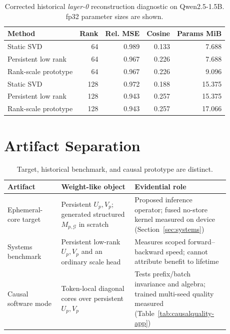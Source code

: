 \begin{table}[h]
\centering
\caption{Corrected historical \emph{layer-0} reconstruction diagnostic on
Qwen2.5-1.5B.  fp32 parameter sizes are shown.}
\label{tab:quality}
\begin{tabular}{lrrrr}
\toprule
Method & Rank & Rel. MSE & Cosine & Params MiB \\
\midrule
Static SVD & 64 & 0.989 & 0.133 & 7.688 \\
Persistent low rank & 64 & 0.967 & 0.226 & 7.688 \\
Rank-scale prototype & 64 & 0.967 & 0.226 & 9.096 \\
Static SVD & 128 & 0.972 & 0.188 & 15.375 \\
Persistent low rank & 128 & 0.943 & 0.257 & 15.375 \\
Rank-scale prototype & 128 & 0.943 & 0.257 & 17.066 \\
\bottomrule
\end{tabular}
\end{table}

\section{Artifact Separation}
\label{app:artifacts}

\begin{table}[h]
\centering
\caption{Target, historical benchmark, and causal prototype are distinct.}
\label{tab:artifact-separation}
\begin{tabular}{>{\raggedright\arraybackslash}p{0.22\linewidth}>{\raggedright\arraybackslash}p{0.30\linewidth}>{\raggedright\arraybackslash}p{0.36\linewidth}}
\toprule
Artifact & Weight-like object & Evidential role \\
\midrule
Ephemeral-core target & Persistent $U_p,V_p$; generated structured $M_{p,\mathcal G}$ in scratch & Proposed inference operator; fused no-store kernel measured on device (Section~\ref{sec:systems}) \\
Systems benchmark & Persistent low-rank $U_p,V_p$ and an ordinary scale head & Measures scoped forward--backward speed; cannot attribute benefit to lifetime \\
Causal software mode & Token-local diagonal cores over persistent $U_p,V_p$ & Tests prefix/batch invariance and algebra; trained multi-seed quality measured (Table~\ref{tab:causalquality-app}) \\
\bottomrule
\end{tabular}
\end{table}

